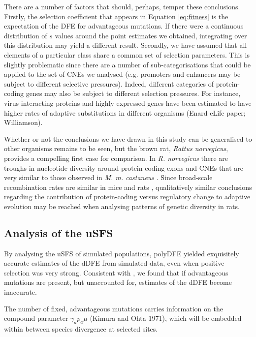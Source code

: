 \documentclass[11pt]{article}
\begin{document}


	There are a number of factors that should, perhaps, temper these conclusions. Firstly, the selection coefficient that appears in Equation \ref{eq:fitness} is the expectation of the DFE for advantageous mutations. If there were a continuous distribution of $s$ values around the point estimates we obtained, integrating over this distribution may yield a different result. Secondly, we have assumed that all elements of a particular class share a common set of selection parameters. This is slightly problematic since there are a number of sub-categorisations that could be applied to the set of CNEs we analysed (e.g. promoters and enhancers may be subject to different selective pressures). Indeed, different categories of protein-coding genes may also be subject to different selection pressures. For instance, virus interacting proteins and highly expressed genes have been estimated to have higher rates of adaptive substitutions in different organisms (Enard eLife paper; Williamson).

Whether or not the conclusions we have drawn in this study can be generalised to other organisms remains to be seen, but the brown rat, \textit{Rattus norvegicus}, provides a compelling first case for comparison. In \textit{R. norvegicus} there are troughs in nucleotide diversity around protein-coding exons and CNEs that are very similar to those observed in \textit{M. m. castaneus} \citep{RN327}. Since broad-scale recombination rates are similar in mice and rats \citep{RN184}, qualitatively similar conclusions regarding the contribution of protein-coding versus regulatory change to adaptive evolution may be reached when analysing patterns of genetic diversity in rats. 



\subsection{Analysis of the uSFS}

	By analysing the uSFS of simulated populations, polyDFE yielded exquisitely accurate estimates of the dDFE from simulated data, even when positive selection was very strong. Consistent with \cite{RN354}, we found that if advantageous mutations are present, but unaccounted for, estimates of the dDFE become inaccurate. 

	The number of fixed, advantageous mutations carries information on the compound parameter $\gamma_a p_a \mu$ (Kimura and Ohta 1971), which will be embedded within between species divergence at selected sites.
	
\end{document}
